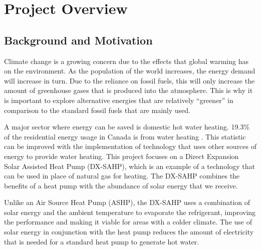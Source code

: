 \chapter{Project Overview}

\section{Background and Motivation}

Climate change is a growing concern due to the effects that global warming has on the environment. As the population of the world increases, the energy demand will increase in turn. Due to the reliance on fossil fuels, this will only increase the amount of greenhouse gases that is produced into the atmosphere. This is why it is important to explore alternative energies that are relatively “greener” in comparison to the standard fossil fuels that are mainly used.

\medskip
A major sector where energy can be saved is domestic hot water heating. 19.3\% of the residential energy usage in Canada is from water heating \cite{water_heaters}. This statistic can be improved with the implementation of technology that uses other sources of energy to provide water heating. This project focuses on a Direct Expansion Solar Assisted Heat Pump (DX-SAHP), which is an example of a technology that can be used in place of natural gas for heating. The DX-SAHP combines the benefits of a heat pump with the abundance of solar energy that we receive.

\medskip
Unlike an Air Source Heat Pump (ASHP), the DX-SAHP uses a combination of solar energy and the ambient temperature to evaporate the refrigerant, improving the performance and making it viable for areas with a colder climate. The use of solar energy in conjunction with the heat pump reduces the amount of electricity that is needed for a standard heat pump to generate hot water.

